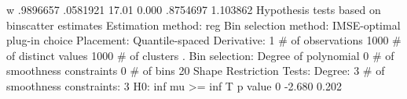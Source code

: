            w {\VBAR}   .9896657   .0581921    17.01   0.000     .8754697    1.103862
{\smallskip}
Hypothesis tests based on binscatter estimates
Estimation method: reg
Bin selection method: IMSE-optimal plug-in choice
Placement: Quantile-spaced
Derivative: 1
{\smallskip}
\# of observations             {\VBAR}    1000
\# of distinct values          {\VBAR}    1000
\# of clusters                 {\VBAR}       .
Bin selection:                {\VBAR} 
         Degree of polynomial {\VBAR}       0
  \# of smoothness constraints {\VBAR}       0
                    \# of bins {\VBAR}      20
{\smallskip}
Shape Restriction Tests:
Degree: 3     \# of smoothness constraints: 3
{\smallskip}
H0: inf mu >=      {\VBAR} inf T             p value
         0         {\VBAR}  -2.680             0.202
